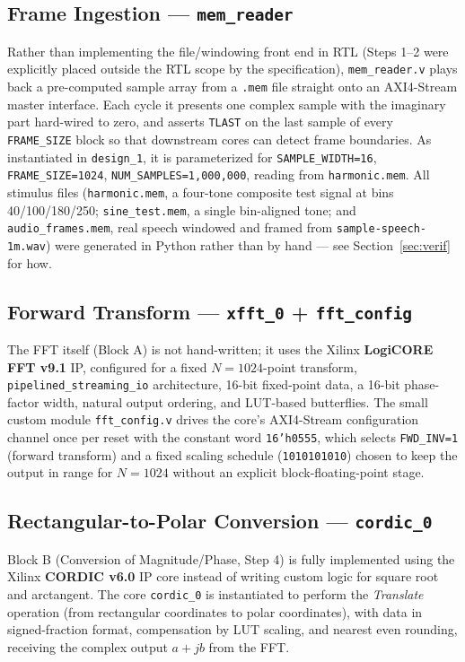 \documentclass[conference,a4paper]{IEEEtran}
\begin{document}
\subsection{Frame Ingestion --- \texttt{mem\_reader}}
Rather than implementing the file/windowing front end in RTL (Steps 1--2 were explicitly
placed outside the RTL scope by the specification), \texttt{mem\_reader.v} plays back a
pre-computed sample array from a \texttt{.mem} file straight onto an AXI4-Stream master
interface. Each cycle it presents one complex sample with the imaginary part hard-wired to
zero, and asserts \texttt{TLAST} on the last sample of every \texttt{FRAME\_SIZE} block so
that downstream cores can detect frame boundaries. As instantiated in \texttt{design\_1},
it is parameterized for \texttt{SAMPLE\_WIDTH=16}, \texttt{FRAME\_SIZE=1024},
\texttt{NUM\_SAMPLES=1{,}000{,}000}, reading from \texttt{harmonic.mem}. All stimulus files
(\texttt{harmonic.mem}, a four-tone composite test signal at bins 40/100/180/250;
\texttt{sine\_test.mem}, a single bin-aligned tone; and \texttt{audio\_frames.mem}, real
speech windowed and framed from \texttt{sample-speech-1m.wav}) were generated in Python
rather than by hand --- see Section~\ref{sec:verif} for how.

\subsection{Forward Transform --- \texttt{xfft\_0} + \texttt{fft\_config}}
The FFT itself (Block A) is not hand-written; it uses the Xilinx \textbf{LogiCORE FFT
v9.1} IP, configured for a fixed $N=1024$-point transform, \texttt{pipelined\_streaming\_io}
architecture, 16-bit fixed-point data, a 16-bit phase-factor width, natural output ordering,
and LUT-based butterflies. The small custom module \texttt{fft\_config.v} drives the
core's AXI4-Stream configuration channel once per reset with the constant word
\texttt{16'h0555}, which selects \texttt{FWD\_INV=1} (forward transform) and a fixed scaling
schedule (\texttt{1010101010}) chosen to keep the output in range for $N=1024$ without an
explicit block-floating-point stage.

\subsection{Rectangular-to-Polar Conversion --- \texttt{cordic\_0}}
Block B (Conversion of Magnitude/Phase, Step 4) is fully implemented using the
Xilinx \textbf{CORDIC v6.0} IP core instead of writing custom logic for square root and arctangent.
The core \texttt{cordic\_0} is instantiated to perform the \textit{Translate} operation (from rectangular
coordinates to polar coordinates), with data in signed-fraction format, compensation by
LUT scaling, and nearest even rounding, receiving the complex output $a+jb$ from the FFT.
\end{document}
